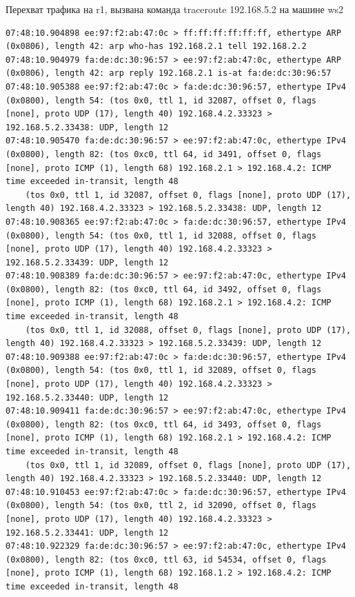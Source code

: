 \documentclass[a4paper,12pt]{article}
\begin{document}
Перехват трафика на r1, вызвана команда traceroute 192.168.5.2 на машине ws2
\begin{Verbatim}
07:48:10.904898 ee:97:f2:ab:47:0c > ff:ff:ff:ff:ff:ff, ethertype ARP (0x0806), length 42: arp who-has 192.168.2.1 tell 192.168.2.2
07:48:10.904979 fa:de:dc:30:96:57 > ee:97:f2:ab:47:0c, ethertype ARP (0x0806), length 42: arp reply 192.168.2.1 is-at fa:de:dc:30:96:57
07:48:10.905388 ee:97:f2:ab:47:0c > fa:de:dc:30:96:57, ethertype IPv4 (0x0800), length 54: (tos 0x0, ttl 1, id 32087, offset 0, flags [none], proto UDP (17), length 40) 192.168.4.2.33323 > 192.168.5.2.33438: UDP, length 12
07:48:10.905470 fa:de:dc:30:96:57 > ee:97:f2:ab:47:0c, ethertype IPv4 (0x0800), length 82: (tos 0xc0, ttl 64, id 3491, offset 0, flags [none], proto ICMP (1), length 68) 192.168.2.1 > 192.168.4.2: ICMP time exceeded in-transit, length 48
	(tos 0x0, ttl 1, id 32087, offset 0, flags [none], proto UDP (17), length 40) 192.168.4.2.33323 > 192.168.5.2.33438: UDP, length 12
07:48:10.908365 ee:97:f2:ab:47:0c > fa:de:dc:30:96:57, ethertype IPv4 (0x0800), length 54: (tos 0x0, ttl 1, id 32088, offset 0, flags [none], proto UDP (17), length 40) 192.168.4.2.33323 > 192.168.5.2.33439: UDP, length 12
07:48:10.908389 fa:de:dc:30:96:57 > ee:97:f2:ab:47:0c, ethertype IPv4 (0x0800), length 82: (tos 0xc0, ttl 64, id 3492, offset 0, flags [none], proto ICMP (1), length 68) 192.168.2.1 > 192.168.4.2: ICMP time exceeded in-transit, length 48
	(tos 0x0, ttl 1, id 32088, offset 0, flags [none], proto UDP (17), length 40) 192.168.4.2.33323 > 192.168.5.2.33439: UDP, length 12
07:48:10.909388 ee:97:f2:ab:47:0c > fa:de:dc:30:96:57, ethertype IPv4 (0x0800), length 54: (tos 0x0, ttl 1, id 32089, offset 0, flags [none], proto UDP (17), length 40) 192.168.4.2.33323 > 192.168.5.2.33440: UDP, length 12
07:48:10.909411 fa:de:dc:30:96:57 > ee:97:f2:ab:47:0c, ethertype IPv4 (0x0800), length 82: (tos 0xc0, ttl 64, id 3493, offset 0, flags [none], proto ICMP (1), length 68) 192.168.2.1 > 192.168.4.2: ICMP time exceeded in-transit, length 48
	(tos 0x0, ttl 1, id 32089, offset 0, flags [none], proto UDP (17), length 40) 192.168.4.2.33323 > 192.168.5.2.33440: UDP, length 12
07:48:10.910453 ee:97:f2:ab:47:0c > fa:de:dc:30:96:57, ethertype IPv4 (0x0800), length 54: (tos 0x0, ttl 2, id 32090, offset 0, flags [none], proto UDP (17), length 40) 192.168.4.2.33323 > 192.168.5.2.33441: UDP, length 12
07:48:10.922329 fa:de:dc:30:96:57 > ee:97:f2:ab:47:0c, ethertype IPv4 (0x0800), length 82: (tos 0xc0, ttl 63, id 54534, offset 0, flags [none], proto ICMP (1), length 68) 192.168.1.2 > 192.168.4.2: ICMP time exceeded in-transit, length 48

\end{Verbatim}
\end{document}
